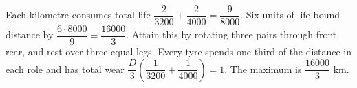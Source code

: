 Each kilometre consumes total life $\dfrac{2}{3200}+\dfrac{2}{4000}=\dfrac{9}{8000}$. Six units of life bound distance by $\dfrac{6\cdot8000}{9}=\dfrac{16000}{3}$. Attain this by rotating three pairs through front, rear, and rest over three equal legs. Every tyre spends one third of the distance in each role and has total wear $\dfrac{D}{3}(\dfrac{1}{3200}+\dfrac{1}{4000})=1$. The maximum is $\boxed{\dfrac{16000}{3}\text{ km}}$.
